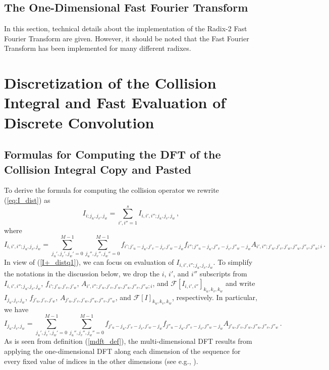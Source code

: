 \documentclass[12pt]{CSUNthesis}
\def\calF{\mathcal{F}}
\begin{document}
\section{The One-Dimensional Fast Fourier Transform}
In this section, technical details about the implementation of the Radix-2 Fast Fourier Transform are given. However, it should be noted that the Fast Fourier Transform has been implemented for many different radixes. 




\chapter{Discretization of the Collision Integral and Fast Evaluation of Discrete Convolution}


\section{Formulas for Computing the DFT of the Collision Integral Copy and Pasted}
To derive the formula for computing the collision operator we rewrite (\ref{eq:I_dist}) as
\begin{equation}
\label{I+_distq1}
I_{i;j_{u},j_{v},j_{w}}= \sum_{i',i''=1}^s I_{i,i',i'';j_{u},j_{v},j_{w}} \, ,
\end{equation}
where 
\begin{equation*}
I_{i,i',i'';j_{u},j_{v},j_{w}}=  \sum_{j_u',j_v',j_w'=0}^{M-1} \sum_{j_u'',j_v'',j_w''=0}^{M-1} f_{i';j'_{u}-j_{u},j'_{v}-j_{v},j'_{w}-j_{w}} f_{i'';j''_{u}-j_{u},j''_{v}-j_{v},j''_{w}-j_{w}} A_{i',i'';j'_{u},j'_{v},j'_{w},j''_u,j''_{v},j''_{w};i}\, .
\end{equation*}
In view of (\ref{I+_distq1}), we can focus on evaluation of $I_{i,i',i'';j_{u},j_{v},j_{w}}$. 
To simplify the notations in the discussion below, we drop the $i$, $i'$, and $i''$ subscripts from 
$I_{i,i',i'';j_{u},j_{v},j_{w}}$, $f_{i';j'_{u},j'_{v},j'_{w}}$, 
$A_{i',i'';j'_{u},j'_{v},j'_{w},j''_u,j''_{v},j''_{w};i}$, and  $\calF[I_{i,i',i''}]_{k_{u},k_{v},k_{w}}$ 
and write $I_{j_u,j_v,j_w}$, $f_{j'_{u},j'_{v},j'_{w}}$, 
$A_{j'_{u},j'_{v},j'_{w},j''_u,j''_{v},j''_{w}}$, and $\calF[I]_{k_{u},k_{v},k_{w}}$, respectively. 
In particular, we have
\begin{equation}
\label{I_all_index}
I_{j_u,j_v,j_w}=  \sum_{j_u',j_v',j_w'=0}^{M-1} \sum_{j_u'',j_v'',j_w''=0}^{M-1}f_{j'_{u}-j_{u},j'_{v}-j_{v},j'_{w}-j_{w}} f_{j''_{u}-j_{u},j''_{v}-j_{v},j''_{w}-j_{w}} A_{j'_{u},j'_{v},j'_{w},j''_u,j''_{v},j''_{w}}\, .
\end{equation}
As is seen from definition (\ref{mdft_def}), the multi-dimensional DFT results from applying the one-dimensional DFT along each dimension of the sequence for every fixed value of indices in the other dimensions (see e.g., \cite{Nussbaumer1982}).
\end{document}
